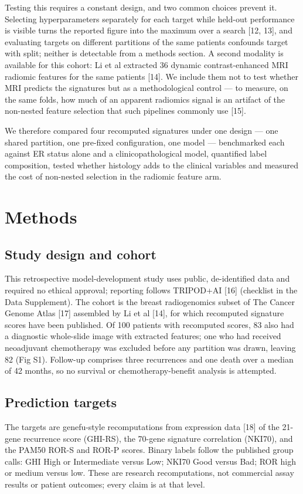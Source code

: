\documentclass[11pt,a4paper]{article}
\begin{document}
Testing this requires a constant design, and two common choices prevent it. Selecting hyperparameters separately for each target while held-out performance is visible turns the reported figure into the maximum over a search [12, 13], and evaluating targets on different partitions of the same patients confounds target with split; neither is detectable from a methods section. A second modality is available for this cohort: Li et al extracted 36 dynamic contrast-enhanced MRI radiomic features for the same patients [14]. We include them not to test whether MRI predicts the signatures but as a methodological control --- to measure, on the same folds, how much of an apparent radiomics signal is an artifact of the non-nested feature selection that such pipelines commonly use [15].

We therefore compared four recomputed signatures under one design --- one shared partition, one pre-fixed configuration, one model --- benchmarked each against ER status alone and a clinicopathological model, quantified label composition, tested whether histology adds to the clinical variables and measured the cost of non-nested selection in the radiomic feature arm.

\section{Methods}
\subsection{Study design and cohort}
This retrospective model-development study uses public, de-identified data and required no ethical approval; reporting follows TRIPOD+AI [16] (checklist in the Data Supplement). The cohort is the breast radiogenomics subset of The Cancer Genome Atlas [17] assembled by Li et al [14], for which recomputed signature scores have been published. Of 100 patients with recomputed scores, 83 also had a diagnostic whole-slide image with extracted features; one who had received neoadjuvant chemotherapy was excluded before any partition was drawn, leaving 82 (Fig S1). Follow-up comprises three recurrences and one death over a median of 42 months, so no survival or chemotherapy-benefit analysis is attempted.

\subsection{Prediction targets}
The targets are genefu-style recomputations from expression data [18] of the 21-gene recurrence score (GHI-RS), the 70-gene signature correlation (NKI70), and the PAM50 ROR-S and ROR-P scores. Binary labels follow the published group calls: GHI High or Intermediate versus Low; NKI70 Good versus Bad; ROR high or medium versus low. These are research recomputations, not commercial assay results or patient outcomes; every claim is at that level.
\end{document}
